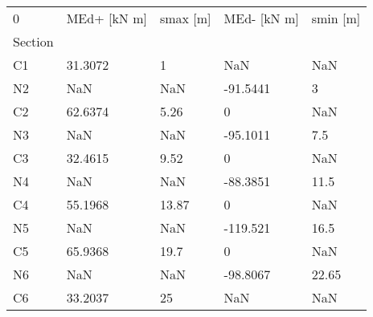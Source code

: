 \begin{tabular}{lllll}
\toprule
0 & MEd+ [kN m] & smax [m] & MEd- [kN m] & smin [m] \\
Section &             &          &             &          \\
\midrule
C1      &     31.3072 &        1 &         NaN &      NaN \\
N2      &         NaN &      NaN &    -91.5441 &        3 \\
C2      &     62.6374 &     5.26 &           0 &      NaN \\
N3      &         NaN &      NaN &    -95.1011 &      7.5 \\
C3      &     32.4615 &     9.52 &           0 &      NaN \\
N4      &         NaN &      NaN &    -88.3851 &     11.5 \\
C4      &     55.1968 &    13.87 &           0 &      NaN \\
N5      &         NaN &      NaN &    -119.521 &     16.5 \\
C5      &     65.9368 &     19.7 &           0 &      NaN \\
N6      &         NaN &      NaN &    -98.8067 &    22.65 \\
C6      &     33.2037 &       25 &         NaN &      NaN \\
\bottomrule
\end{tabular}
